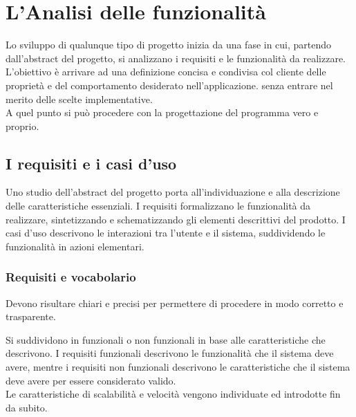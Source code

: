 \section{L'Analisi delle funzionalità}

Lo sviluppo di qualunque tipo di progetto inizia da una fase in cui, partendo dall’abstract del progetto,  si analizzano i requisiti e le funzionalità da realizzare.
L’obiettivo è arrivare ad una definizione concisa e condivisa col cliente delle proprietà e del comportamento desiderato nell’applicazione.
senza entrare nel merito delle scelte implementative.\\
A quel punto si può procedere con la progettazione del programma vero e proprio.

\vspace{50mm}

\subsection{I requisiti e i casi d’uso}

Uno studio dell’abstract del progetto porta all’individuazione e alla descrizione delle caratteristiche essenziali.
I requisiti formalizzano le funzionalità da realizzare, sintetizzando e schematizzando gli elementi descrittivi del prodotto.
I casi d'uso descrivono le interazioni tra l'utente e il sistema, suddividendo le funzionalità in azioni elementari.\\
\clearpage
\subsubsection{Requisiti e vocabolario}
Devono risultare chiari e precisi per permettere di procedere in modo corretto e trasparente.

Si suddividono in funzionali o non funzionali in base alle caratteristiche che descrivono.
I requisiti funzionali descrivono le funzionalità che il sistema deve avere,
mentre i requisiti non funzionali descrivono le caratteristiche che il sistema deve avere per essere considerato valido.\\

Le caratteristiche di scalabilità e velocità vengono individuate ed introdotte fin da subito.

